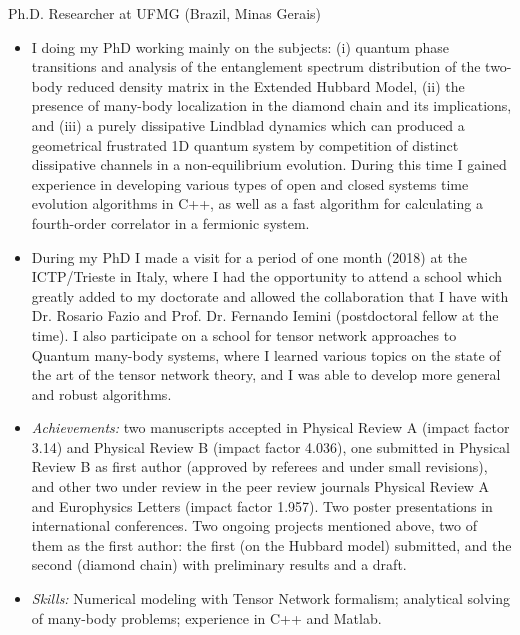 \documentclass[a4paper,10pt]{article}
\newlength{\cvcolumngapwidth}
\newlength{\cvleftcolumnwidth}
\newlength{\cvrightcolumnwidth}
\newcommand{\cvtitlestyle}[1]{{\normalsize\cvtitlefont\textcolor{cvtitlecolor}{#1}}}
\newcommand{\cvdurationstyle}[1]{{\normalsize\cvdurationfont\textcolor{cvdurationcolor}{#1}}}
\newlength{\cvafteritemskipamount}
\newlength{\cvaftertitleskipamount}
\newlength{\cvparskip}
\newcommand{\cvitem}[2]{
    \begin{minipage}[t]{\cvleftcolumnwidth}
        \raggedleft #1
    \end{minipage}%
    \hspace{\cvcolumngapwidth}%
    \begin{minipage}[t]{\cvrightcolumnwidth}
        \setlength{\parskip}{\cvparskip} #2
    \end{minipage}
    \vspace{\cvafteritemskipamount}}
\newcommand{\cvtitle}[1]{
    \cvtitlestyle{#1}
    \vspace{\cvaftertitleskipamount}
    \vspace{-\cvparskip}}
\begin{document}
\cvitem{\cvdurationstyle{2016 - Present}}
    {\cvtitle{Ph.D. Researcher at UFMG (Brazil, Minas Gerais)}
    
    \begin{itemize}[leftmargin=*]
        \vspace{0.2cm}
        \item I doing my PhD working mainly on the subjects: (i) quantum phase transitions and analysis of the entanglement spectrum distribution of the two-body reduced density matrix in the Extended Hubbard Model, (ii) the presence of many-body localization in the diamond chain and its implications, and (iii) a purely dissipative Lindblad dynamics which can produced a geometrical frustrated 1D quantum system by competition of distinct dissipative channels in a non-equilibrium evolution. During this time I gained experience in developing various types of open and closed systems time evolution algorithms in C++, as well as a fast algorithm for calculating a fourth-order correlator in a fermionic system.
        \vspace{0.2cm}
        \item During my PhD I made a visit for a period of one month (2018) at the ICTP/Trieste in Italy, where I had the opportunity to attend a school which greatly added to my doctorate and allowed the collaboration that I have with Dr. Rosario Fazio and Prof. Dr. Fernando Iemini (postdoctoral fellow at the time). I also participate on a school for tensor network approaches to Quantum many-body systems, where I learned various topics on the state of the art of the tensor network theory, and I was able to develop more general and robust algorithms.
        \vspace{0.2cm}
        \item \textit{Achievements:} two manuscripts accepted in Physical Review A (impact factor 3.14) and Physical Review B (impact factor 4.036), one submitted in Physical Review B as first author (approved by referees and under small revisions), and other two under review in the peer review journals Physical Review A and Europhysics Letters (impact factor 1.957). Two poster presentations in international conferences. Two ongoing projects mentioned above, two of them as the first author: the first (on the Hubbard model) submitted, and the second (diamond chain) with preliminary results and a draft.
        \vspace{0.2cm}
        \item \textit{Skills:} Numerical modeling with Tensor Network formalism;
        analytical solving of many-body problems; experience in C++ and Matlab.
    \end{itemize}}
\end{document}
